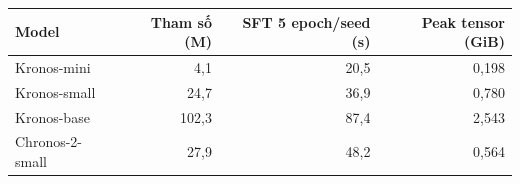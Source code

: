 \begin{tabular}{@{}lrrr@{}}
\toprule
Model & Tham số (M) & SFT 5 epoch/seed (s) & Peak tensor (GiB) \\
\midrule
Kronos-mini & 4,1 & 20,5 & 0,198 \\
Kronos-small & 24,7 & 36,9 & 0,780 \\
Kronos-base & 102,3 & 87,4 & 2,543 \\
Chronos-2-small & 27,9 & 48,2 & 0,564 \\
\bottomrule
\end{tabular}
